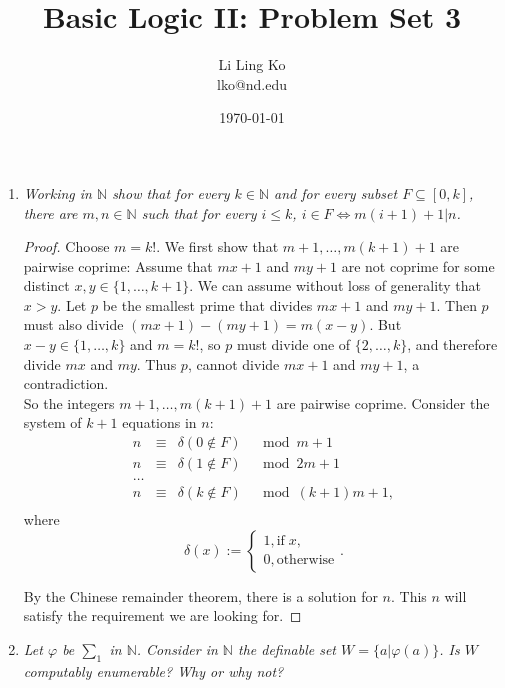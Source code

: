 \documentclass{article}
\begin{document}
\title{Basic Logic II: Problem Set 3}
\author{Li Ling Ko\\ lko@nd.edu}
\date{\today}
\maketitle

\begin{enumerate}[label={\bf Q\arabic*:}]
  \item \it Working in $\mathbb{N}$ show that for every $k\in\mathbb{N}$ and
    for every subset $F\subseteq[0,k]$, there are $m,n\in\mathbb{N}$ such
    that for every $i\leq k$, $i\in F \Leftrightarrow m(i+1)+1|n$.

    \begin{proof}
      Choose $m=k!$. We first show that $m+1,\ldots,m(k+1)+1$ are pairwise
      coprime: Assume that $mx+1$ and $my+1$ are not coprime for some
      distinct $x,y\in\{1,\ldots,k+1\}$. We can assume without loss of
      generality that $x>y$. Let $p$ be the smallest prime that divides
      $mx+1$ and $my+1$. Then $p$ must also divide $(mx+1)-(my+1)=m(x-y)$.
      But $x-y\in\{1,\ldots,k\}$ and $m=k!$, so $p$ must divide one of
      $\{2,\ldots,k\}$, and therefore divide $mx$ and $my$. Thus $p$,
      cannot divide $mx+1$ and $my+1$, a contradiction. \\

      So the integers $m+1,\ldots,m(k+1)+1$ are pairwise coprime. Consider
      the system of $k+1$ equations in $n$:
      \[\begin{array}{llll}
        n &\equiv &\delta(0\not\in F) &\mod{m+1}\\
        n &\equiv &\delta(1\not\in F) &\mod{2m+1}\\
        \ldots &&&\\
        n &\equiv &\delta(k\not\in F) &\mod{(k+1)m+1},\\
      \end{array}\]
      where
      \[\delta(x)
      :=\begin{cases}1,\text{if}\;x,\\0,\text{otherwise}\end{cases}.\]

      By the Chinese remainder theorem, there is a solution for $n$. This
      $n$ will satisfy the requirement we are looking for.
    \end{proof}

  \item \it Let $\varphi$ be $\sum_1$ in $\mathbb{N}$. Consider in
    $\mathbb{N}$ the definable set $W=\{a|\varphi(a)\}$. Is $W$ computably
    enumerable? Why or why not?


\end{enumerate}
\end{document}
